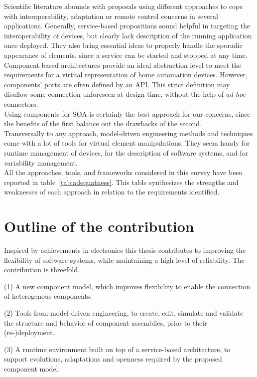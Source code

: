 Scientific literature abounds with proposals using different approaches to cope with interoperability, adaptation or remote control concerns in several applications. Generally, service-based propositions sound helpful in targeting the interoperability of devices, but clearly lack description of the running application once deployed. They also bring essential ideas to properly handle the sporadic appearance of elements, since a service can be started and stopped at any time.\\
Component-based architectures provide an ideal abstraction level to meet the requirements for a virtual representation of home automation devices. However, components' ports are often defined by an API. This strict definition may disallow some connection unforeseen at design time, without the help of {\it ad-hoc} connectors.\\
Using components for SOA is certainly the best approach for our concerns, since the benefits of the first balance out the drawbacks of the second.\\
Transversally to any approach, model-driven engineering methods and techniques come with a lot of tools for virtual element manipulations. They seem handy for runtime management of devices, for the description of software systems, and for variability management.\\

All the approaches, tools, and frameworks considered in this survey have been reported in table~\ref{tab:adequatness}. This table synthesizes the strengths and weaknesses of each approach in relation to the requirements identified.

\section{Outline of the contribution}


Inspired by achievements in electronics this thesis contributes to improving the flexibility of software systems, while maintaining a high level of reliability. The contribution is threefold.
\par (1) A new component model, which improves flexibility to enable the connection of heterogenous components.
\par (2) Tools from model-driven engineering, to create, edit, simulate and validate the structure and behavior of component assemblies, prior to their (re-)deployment. 
\par (3) A runtime environment built on top of a service-based architecture, to support evolutions, adaptations and openness required by the proposed component model.\\

